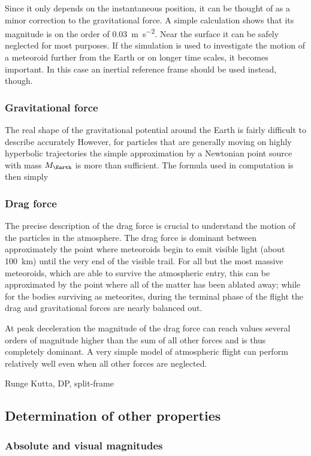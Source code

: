             Since it only depends on the instantaneous position, it can be thought of as a minor correction to the
            gravitational force. A simple calculation shows that its magnitude is on the order
            of \SI{0.03}{\metre\per\second\squared}. Near the surface it can be safely neglected for most purposes.
            If the simulation is used to investigate the motion of a meteoroid further from the Earth or
            on longer time scales, it becomes important.
            In this case an inertial reference frame should be used instead, though.

        \subsubsection{Gravitational force} \label{saig}
            The real shape of the gravitational potential around the Earth is fairly difficult to describe accurately
            However, for particles that are generally moving on highly hyperbolic trajectories the
            simple approximation by a Newtonian point source with mass $M_\Earth$ is more than sufficient.
            The formula used in computation is then simply

        \subsubsection{Drag force} \label{said}
            The precise description of the drag force is crucial to understand the motion
            of the particles in the atmosphere. The drag force is dominant between approximately
            the point where meteoroids begin to emit visible light (about \SI{100}{\kilo\metre})
            until the very end of the visible trail. For all but the most massive meteoroids,
            which are able to survive the atmospheric entry, this can be approximated
            by the point where all of the matter has been ablated away; while for the bodies
            surviving as meteorites, during the terminal phase of the flight the drag and
            gravitational forces are nearly balanced out.

            At peak deceleration the magnitude of the drag force can reach values several orders of magnitude
            higher than the sum of all other forces and is thus completely dominant.
            A very simple model of atmospheric flight can perform relatively well even when all other forces are neglected.


        Runge Kutta, DP, split-frame

    \subsection{Determination of other properties} \label{sap}

        \subsubsection{Absolute and visual magnitudes} \label{sapm}

